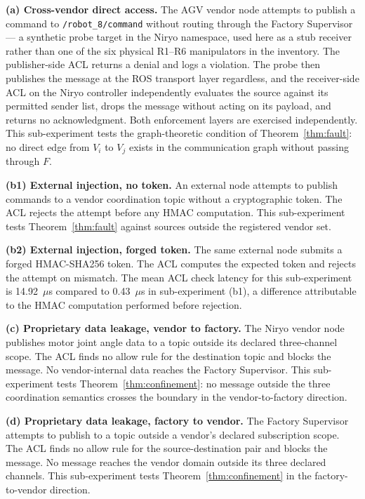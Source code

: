 \documentclass[a4paper,fleqn]{cas-dc}
\begin{document}
\textbf{(a) Cross-vendor direct access.} The AGV vendor node attempts to publish a command to \texttt{/robot\_8/command} without routing through the Factory Supervisor --- a synthetic probe target in the Niryo namespace, used here as a stub receiver rather than one of the six physical R1--R6 manipulators in the inventory. The publisher-side ACL returns a denial and logs a violation. The probe then publishes the message at the ROS transport layer regardless, and the receiver-side ACL on the Niryo controller independently evaluates the source against its permitted sender list, drops the message without acting on its payload, and returns no acknowledgment. Both enforcement layers are exercised independently. This sub-experiment tests the graph-theoretic condition of Theorem~\ref{thm:fault}: no direct edge from $V_i$ to $V_j$ exists in the communication graph without passing through $F$.

\textbf{(b1) External injection, no token.} An external node attempts to publish commands to a vendor coordination topic without a cryptographic token. The ACL rejects the attempt before any HMAC computation. This sub-experiment tests Theorem~\ref{thm:fault} against sources outside the registered vendor set.

\textbf{(b2) External injection, forged token.} The same external node submits a forged HMAC-SHA256 token. The ACL computes the expected token and rejects the attempt on mismatch. The mean ACL check latency for this sub-experiment is 14.92~$\mu$s compared to 0.43~$\mu$s in sub-experiment (b1), a difference attributable to the HMAC computation performed before rejection.

\textbf{(c) Proprietary data leakage, vendor to factory.} The Niryo vendor node publishes motor joint angle data to a topic outside its declared three-channel scope. The ACL finds no allow rule for the destination topic and blocks the message. No vendor-internal data reaches the Factory Supervisor. This sub-experiment tests Theorem~\ref{thm:confinement}: no message outside the three coordination semantics crosses the boundary in the vendor-to-factory direction.

\textbf{(d) Proprietary data leakage, factory to vendor.} The Factory Supervisor attempts to publish to a topic outside a vendor's declared subscription scope. The ACL finds no allow rule for the source-destination pair and blocks the message. No message reaches the vendor domain outside its three declared channels. This sub-experiment tests Theorem~\ref{thm:confinement} in the factory-to-vendor direction.
\end{document}
